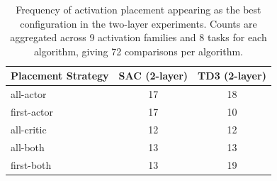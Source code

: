\begin{table}[!htbp]
\centering
\caption{Frequency of activation placement appearing as the best configuration in the two-layer experiments. Counts are aggregated across 9 activation families and 8 tasks for each algorithm, giving 72 comparisons per algorithm.}
\label{tab:placement-frequency-all}
\small
\setlength{\tabcolsep}{6pt}
\renewcommand{\arraystretch}{1.1}
\begin{tabular}{lcc}
\toprule
Placement Strategy & SAC (2-layer) & TD3 (2-layer) \\
\midrule
all-actor & 17 & 18 \\
first-actor & 17 & 10 \\
all-critic & 12 & 12 \\
all-both & 13 & 13 \\
first-both & 13 & 19 \\
\bottomrule
\end{tabular}
\end{table}

